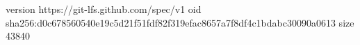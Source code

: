 version https://git-lfs.github.com/spec/v1
oid sha256:d0c678560540e19c5d21f51fdf82f319efac8657a7f8df4c1bdabc30090a0613
size 43840
